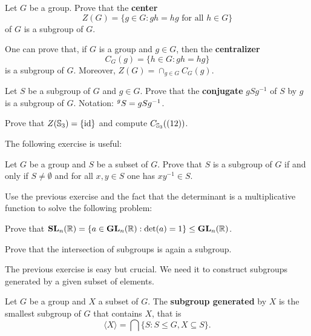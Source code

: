\begin{exercise}
\label{xca:center}
        Let $G$ be a group. Prove that the \textbf{center} 
        \[
                Z(G)=\{g\in G:gh=hg\text{ for all $h\in G$}\}
        \]
        of $G$ is a subgroup of $G$. 
\end{exercise}

One can prove that, if $G$ is a group and $g\in G$, then 
the \textbf{centralizer} 
\[
C_G(g)=\{h\in G:gh=hg\}
\]
is a subgroup of $G$. Moreover, 
$Z(G)=\cap_{g\in G}C_G(g)$. 

\begin{exercise}
        \label{xca:conjugate}
        Let $S$ be a subgroup of $G$ and $g\in G$. Prove that
        the \textbf{conjugate} $gSg^{-1}$
        of $S$ by $g$ is a subgroup of $G$. 
        Notation: $\prescript{g}{}S=gSg^{-1}$.
\end{exercise}


\begin{exercise}
\label{xca:center_S3}
        Prove that $Z(\mathbb{S}_3)=\{\operatorname{id}\}$ and compute $C_{\mathbb{S}_3}((12))$.
\end{exercise}

The following exercise is useful: 

\begin{exercise}
\label{xca:subgroup}
        Let $G$ be a group and $S$ be a subset of $G$. 
        Prove that $S$ is a subgroup of $G$ if and only if 
        $S\ne\emptyset$ and for all $x,y\in S$ one has
        $xy^{-1}\in S$.
\end{exercise}

Use the previous exercise and
the fact that the determinant is a multiplicative function
to solve the following problem:

\begin{exercise}
\label{xca:SL_subgroup}
Prove that $\mathbf{SL}_n(\mathbb{R})=\{a\in\mathbf{GL}_n(\mathbb{R}):\det(a)=1\}\leq\mathbf{GL}_n(\mathbb{R})$. 
\end{exercise}

\begin{exercise}
\label{xca:intersection}
    Prove that the intersection of subgroups is again a subgroup.
\end{exercise}

The previous exercise is easy but crucial. We need it 
to construct subgroups generated 
by a given subset of elements. 

\begin{definition}
        Let $G$ be a group and $X$ a subset of $G$. The \textbf{subgroup
        generated} by $X$ is the smallest subgroup of $G$ that contains
        $X$, that is 
        \[
            \langle X\rangle=\bigcap\{S:S\leq G,X\subseteq S\}.
        \]
\end{definition}

